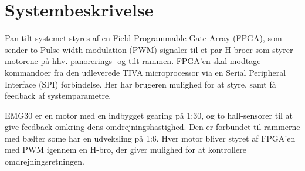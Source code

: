 \section{Systembeskrivelse}

Pan-tilt systemet styres af en Field Programmable Gate Array (FPGA), som sender to Pulse-width modulation (PWM) signaler til et par H-broer som styrer motorene på hhv. panorerings- og tilt-rammen.
FPGA’en skal modtage kommandoer fra den udleverede TIVA microprocessor via en Serial Peripheral Interface (SPI) forbindelse.
Her har brugeren mulighed for at styre, samt få feedback af systemparametre.

EMG30\cite{emg30Data} er en motor med en indbygget gearing på 1:30, og to hall-sensorer til at give feedback omkring dens omdrejningshastighed. Den er forbundet til rammerne med bælter some har en udveksling på 1:6. Hver motor bliver styret af FPGA'en med PWM igennem en H-bro, der giver mulighed for at kontrollere omdrejningsretningen.